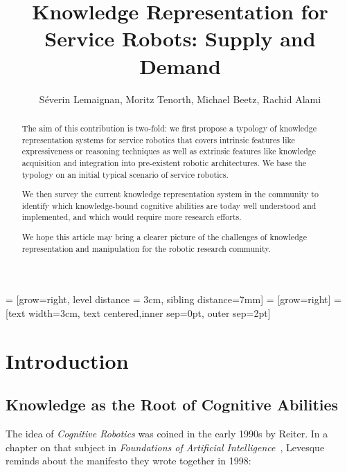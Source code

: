 \documentclass[a4paper, twocolumn]{article}
\title{Knowledge Representation for Service Robots: Supply and Demand}
\author{Séverin Lemaignan, Moritz Tenorth, Michael Beetz, Rachid Alami}
\begin{document}
 = [grow=right, level distance = 3cm, sibling distance=7mm]
 = [grow=right]
 = [text width=3cm, text centered,inner sep=0pt, outer sep=2pt] %

\maketitle
\tableofcontents


\begin{abstract}

The aim of this contribution is two-fold: we first propose a typology of
knowledge representation systems for service robotics that covers intrinsic
features like expressiveness or reasoning techniques as well as extrinsic
features like knowledge acquisition and integration into pre-existent robotic
architectures. We base the typology on an initial typical scenario of service
robotics.

We then survey the current knowledge representation system in the community to
identify which knowledge-bound cognitive abilities are today well understood
and implemented, and which would require more research efforts.

We hope this article may bring a clearer picture of the challenges of knowledge
representation and manipulation for the robotic research community.

\end{abstract}



\section{Introduction}
\label{sect|intro}

\subsection{Knowledge as the Root of Cognitive Abilities}
\label{sect|cognitive-abilities}

The idea of \emph{Cognitive Robotics} was coined in the early 1990s by Reiter.
In a chapter on that subject in \emph{Foundations of Artificial
Intelligence}~\cite{Levesque2008}, Levesque reminds about the manifesto they
wrote together in 1998:
\end{document}

